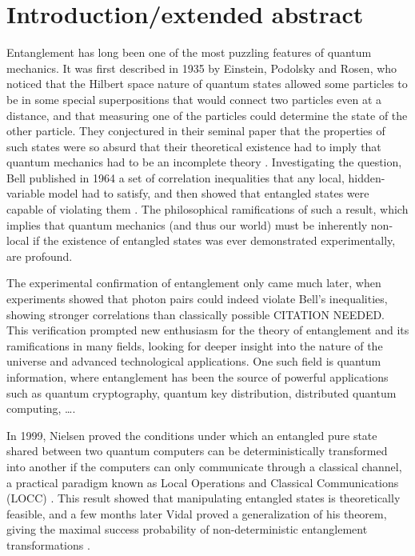 \chapter*{Introduction/extended abstract}

Entanglement has long been one of the most puzzling features of quantum mechanics. It was first described in 1935 by Einstein, Podolsky and Rosen, who noticed that the Hilbert space nature of quantum states allowed some particles to be in some special superpositions that would connect two particles even at a distance, and that measuring one of the particles could determine the state of the other particle. They conjectured in their seminal paper that the properties of such states were so absurd that their theoretical existence had to imply that quantum mechanics had to be an incomplete theory \cite{einstein_can_1935}. Investigating the question, Bell published in 1964 a set of correlation inequalities that any local, hidden-variable model had to satisfy, and then showed that entangled states were capable of violating them \cite{bell_einstein_1964}. The philosophical ramifications of such a result, which implies that quantum mechanics (and thus our world) must be inherently non-local if the existence of entangled states was ever demonstrated experimentally, are profound.

The experimental confirmation of entanglement only came much later, when experiments showed that photon pairs could indeed violate Bell's inequalities, showing stronger correlations than classically possible CITATION NEEDED. This verification prompted new enthusiasm for the theory of entanglement and its ramifications in many fields, looking for deeper insight into the nature of the universe and advanced technological applications. One such field is quantum information, where entanglement has been the source of powerful applications such as quantum cryptography, quantum key distribution, distributed quantum computing, \dots \cite{horodecki_quantum_2009}.

In 1999, Nielsen proved the conditions under which an entangled pure state shared between two quantum computers can be deterministically transformed into another if the computers can only communicate through a classical channel, a practical paradigm known as Local Operations and Classical Communications (LOCC) \cite{nielsen_conditions_1999}. This result showed that manipulating entangled states is theoretically feasible, and a few months later Vidal proved a generalization of his theorem, giving the maximal success probability of non-deterministic entanglement transformations \cite{vidal_entanglement_1999}. 


